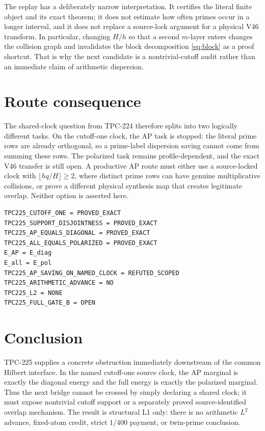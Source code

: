 \documentclass[11pt]{article}
\begin{document}
The replay has a deliberately narrow interpretation.  It certifies the
literal finite object and its exact theorem; it does not estimate how often
primes occur in a longer interval, and it does not replace a source-lock
argument for a physical V46 transform.  In particular, changing \(H/h\) so
that a second \(m\)-layer enters changes the collision graph and invalidates
the block decomposition \eqref{eq:block} as a proof shortcut.  That is why
the next candidate is a nontrivial-cutoff audit rather than an immediate
claim of arithmetic dispersion.

\section{Route consequence}

The shared-clock question from TPC-224 therefore splits into two logically
different tasks.  On the cutoff-one clock, the AP task is stopped: the literal
prime rows are already orthogonal, so a prime-label dispersion saving cannot
come from summing these rows.  The polarized task remains profile-dependent,
and the exact V46 transfer is still open.  A productive AP route must either
use a source-locked clock with \(\lfloor hq/H\rfloor\geq2\), where distinct
prime rows can have genuine multiplicative collisions, or prove a different
physical synthesis map that creates legitimate overlap.  Neither option is
asserted here.

\begin{verbatim}
TPC225_CUTOFF_ONE = PROVED_EXACT
TPC225_SUPPORT_DISJOINTNESS = PROVED_EXACT
TPC225_AP_EQUALS_DIAGONAL = PROVED_EXACT
TPC225_ALL_EQUALS_POLARIZED = PROVED_EXACT
E_AP = E_diag
E_all = E_pol
TPC225_AP_SAVING_ON_NAMED_CLOCK = REFUTED_SCOPED
TPC225_ARITHMETIC_ADVANCE = NO
TPC225_L2 = NONE
TPC225_FULL_GATE_B = OPEN
\end{verbatim}

\section{Conclusion}

TPC-225 supplies a concrete obstruction immediately downstream of the common
Hilbert interface.  In the named cutoff-one source clock, the AP marginal is
exactly the diagonal energy and the full energy is exactly the polarized
marginal.  Thus the next bridge cannot be crossed by simply declaring a
shared clock; it must expose nontrivial cutoff support or a separately proved
source-identified overlap mechanism.  The result is structural L1 only:
there is no arithmetic \(L^2\) advance, fixed-atom credit, strict
\(1/400\) payment, or twin-prime conclusion.



\end{document}
